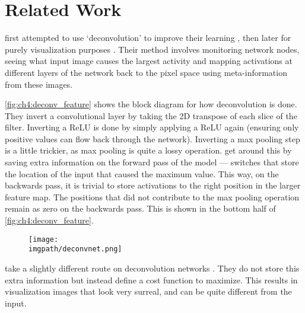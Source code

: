 \section{Related Work}
  \citeauthor{zeiler_adaptive_2011} first attempted to use `deconvolution' to
  improve their learning \cite{zeiler_adaptive_2011}, then later for purely
  visualization purposes \cite{zeiler_visualizing_2014}. Their method
  involves monitoring network nodes, seeing what input image causes the largest
  activity and mapping activations at different layers of the network back to the pixel
  space using meta-information from these images.

  \autoref{fig:ch4:deconv_feature} shows the block diagram for how deconvolution is
  done. They invert a convolutional layer by taking the 2D transpose of each
  slice of the filter. Inverting a ReLU is done by simply applying a ReLU again
  (ensuring only positive values can flow back through the network).
  Inverting a max pooling step is a little trickier, as max pooling is quite a lossy
  operation. \citeauthor{zeiler_adaptive_2011} get around this by saving extra
  information on the forward pass of the model --- switches that store the
  location of the input that caused the maximum value. This way, on the
  backwards pass, it is trivial to store activations to the right position in
  the larger feature map. The positions that did not contribute to
  the max pooling operation remain as zero on the backwards pass. This is shown
  in the bottom half of \autoref{fig:ch4:deconv_feature}.

  \begin{figure}
    \centering
      \texttt{[image: \\imgpath/deconvnet.png]}
      \label{fig:ch4:deconv_feature}
  \end{figure}

  \citeauthor{mahendran_understanding_2015} take a slightly different route on
  deconvolution networks \cite{mahendran_understanding_2015}. They do not
  store this extra information but instead define a cost function to maximize.
  This results in visualization images that look very surreal, and can be
  quite different from the input.

